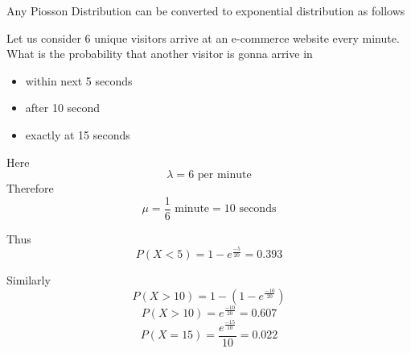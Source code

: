 \documentclass[twoside,12pt]{report}  %
\begin{document}
\noindent
Any Piosson Distribution can be converted to exponential distribution as follows
\\
\begin{tcolorbox}[colback=blue!5!white, colframe=blue!75!black, title = \textbf{Exponential Distribution Function}]
	Let us consider 6 unique visitors arrive at an e-commerce website every minute. What is the probability that another visitor is gonna arrive in
	\begin{itemize}
		\item within next 5 seconds
		\item after 10 second
		\item exactly at 15 seconds
	\end{itemize}
	Here 
	$$ \lambda = 6 \mbox{ per minute} $$
	Therefore
	$$ \mu = \frac{1}{6}\mbox{ minute} = 10 \mbox{ seconds} $$
	
	Thus
	$$ P(X < 5) =  1 - e^{\frac{-5}{20}} = 0.393$$
	
	Similarly
	$$ P(X > 10) =  1- (1 - e^{\frac{-10}{20}}) $$
	$$ P(X > 10) =  e^{\frac{-10}{20}} = 0.607$$
	$$ P(X = 15) =  \frac{e^{\frac{-15}{10}}}{10} = 0.022 $$
	

\end{tcolorbox}
\end{document}
